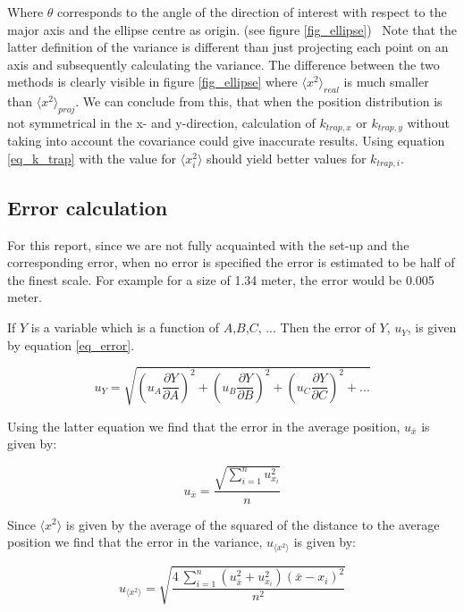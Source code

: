 Where $\theta$ corresponds to the angle of the direction of interest with respect to the major axis and the ellipse centre as origin. (see figure \ref{fig_ellipse}) \
Note that the latter definition of the variance is different than just projecting each point on an axis and subsequently calculating the variance. The difference between the two methods is clearly visible in figure \ref{fig_ellipse} where $\langle x^2 \rangle _{real}$ is much smaller than $\langle x^2 \rangle _{proj}$. We can conclude from this, that when the position distribution is not symmetrical in the x- and y-direction, calculation of $k_{trap,x}$ or $k_{trap,y}$ without taking into account the covariance could give inaccurate results. Using equation \ref{eq_k_trap} with the value for $  \langle x_i^2 \rangle $ should yield better values for $k_{trap,i}$.


\subsection{Error calculation}

For this report, since we are not fully acquainted with the set-up and the corresponding error, when no error is specified the error is estimated to be half of the finest scale. For example for a size of 1.34 meter, the error would be 0.005 meter.

If $Y$ is a variable which is a function of $A$,$B$,$C$, ... Then the error of $Y$, $u_Y$, is given by equation \ref{eq_error}.

\begin{equation}
	\label{eq_error}
	u_Y = \sqrt{\left(u_A \frac{\partial Y}{\partial A}\right)^2 + \left(u_B \frac{\partial Y}{\partial B}\right)^2 + \left(u_C \frac{\partial Y}{\partial C}\right)^2 + ...}
\end{equation}

Using the latter equation we find that the error in the average position, $u_{\bar{x}}$ is given by:

\begin{equation}
	\label{eq_u_mean}
	u_{\bar{x}} =  \frac{ \sqrt{ \sum_{i=1}^n u_{x_i}^2}}{n}
\end{equation}

Since $ \langle x^2 \rangle $ is given by the average of the squared of the distance to the average position we find that the error in the variance, $u_{ \langle x^2 \rangle } $ is given by:

\begin{equation}
	\label{eq_u_var}
	u_{ \langle x^2 \rangle }=  \sqrt{ \frac{ 4 \: \sum_{i=1}^n    \left( u_{\bar{x}}^2 + u_{x_i}^2 \right) \left( \bar{x} - x_i \right)^2}{n^2}}
\end{equation}

